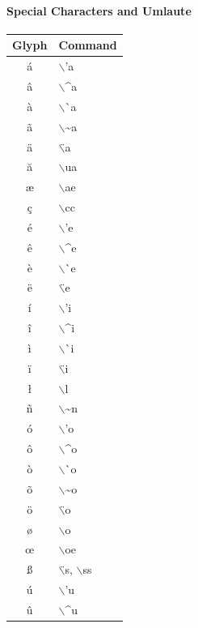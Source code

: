 \paragraph{Special Characters and Umlaute}

\begin{center}
  \begin{tabular}{|c|l|} \hline
    \textbf{Glyph} & \textbf{Command}\\ \hline
    \'{a} & $\backslash$'{}a\\ \hline
    \^{a} & $\backslash$\^{}a\\ \hline
    \`{a} & $\backslash$\`{}a\\ \hline
    \~{a} & $\backslash$\~{}a\\ \hline
    \"{a} & $\backslash$\"{}a\\ \hline
    \u{a} & $\backslash$ua\\ \hline
    \ae & $\backslash$ae\\ \hline
    \c{c} & $\backslash$cc\\ \hline
    \'{e} & $\backslash$'{}e\\ \hline
    \^{e} & $\backslash$\^{}e\\ \hline
    \`{e} & $\backslash$\`{}e\\ \hline
    \"{e} & $\backslash$\"{}e\\ \hline
    \'{i} & $\backslash$'{}i\\ \hline
    \^{i} & $\backslash$\^{}i\\ \hline
    \`{i} & $\backslash$\`{}i\\ \hline
    \"{i} & $\backslash$\"{}i\\ \hline
    \l & $\backslash$l\\ \hline
    \~{n} & $\backslash$\~{}n\\ \hline
    \'{o} & $\backslash$'{}o\\ \hline
    \^{o} & $\backslash$\^{}o\\ \hline
    \`{o} & $\backslash$\`{}o\\ \hline
    \~{o} & $\backslash$\~{}o\\ \hline
    \"{o} & $\backslash$\"{}o\\ \hline
    \o & $\backslash$o\\ \hline
    \oe & $\backslash$oe\\ \hline
    \ss & $\backslash$\"{}s, $\backslash$ss\\ \hline
    \'{u} & $\backslash$'{}u\\ \hline
    \^{u} & $\backslash$\^{}u\\ \hline

\end{tabular}
\end{center}
